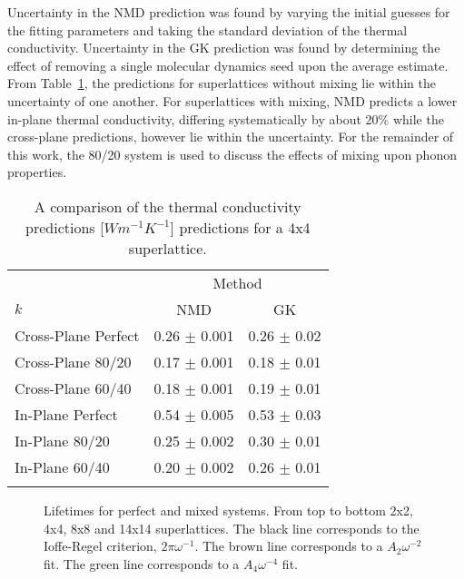\documentclass[aps,prb,preprint,preprintnumbers,amsmath,amssymb,floatfix,superscriptaddress]{revtex4}
\begin{document}
Uncertainty in the NMD prediction was found by varying the initial guesses for the fitting parameters and taking the standard deviation of the thermal conductivity. Uncertainty in the GK prediction was found by determining the effect of removing a single molecular dynamics seed upon the average estimate. From Table~\ref{TB:validate}, the predictions for superlattices without mixing lie within the uncertainty of one another. For superlattices with mixing, NMD predicts a lower in-plane thermal conductivity, differing systematically by about 20\% while the cross-plane predictions, however lie within the uncertainty. For the remainder of this work, the 80/20 system is used to discuss the effects of mixing upon phonon properties.
\begin{table}
\begin{center}
\begin{tabular}{lcc}
\hline\noalign{\smallskip}
&\multicolumn{2}{c}{Method} \\
\cline{2-3}\noalign{\smallskip}
$k$ & NMD  & GK  \\
\noalign{\smallskip}\hline\noalign{\smallskip}
Cross-Plane Perfect  & 0.26 $\pm$ 0.001& 0.26 $\pm$ 0.02\\
Cross-Plane 80/20    & 0.17  $\pm$ 0.001   &   0.18 $\pm$ 0.01 \\
Cross-Plane 60/40    & 0.18  $\pm$ 0.001   &   0.19 $\pm$ 0.01 \\
In-Plane Perfect   & 0.54 $\pm$ 0.005 & 0.53 $\pm$ 0.03  \\
In-Plane 80/20  & 0.25 $\pm$ 0.002 & 0.30 $\pm$ 0.01  \\
In-Plane 60/40   & 0.20 $\pm$ 0.002 & 0.26 $\pm$ 0.01  \\
\noalign{\smallskip}\hline
\end{tabular}
\end{center}
\renewcommand{\table}{Table.}
\caption{A comparison of the thermal conductivity predictions [$Wm^{-1}K^{-1}$] predictions for a 4x4 superlattice.}
\label{TB:validate}
\end{table}
\renewcommand{\textfraction}{0.0}
\begin{figure}%
\begin{center}
\renewcommand{\figure}{Fig.}
\caption{Lifetimes for perfect and mixed systems. From top to bottom 2x2, 4x4, 8x8 and 14x14 superlattices. The black line corresponds to the Ioffe-Regel criterion, $2\pi\omega^{-1}$. The brown line corresponds to a $A_2\omega^{-2}$ fit. The green line corresponds to a $A_4\omega^{-4}$ fit.}
\label{FIG:lifetime}
\end{center}
\end{figure}
\end{document}
